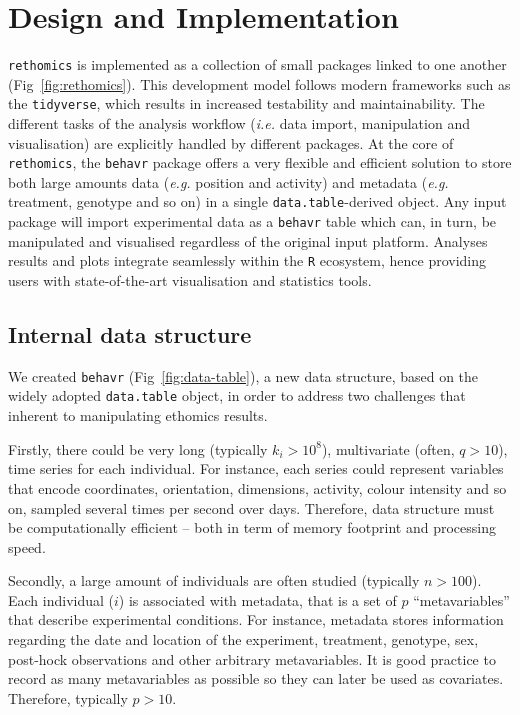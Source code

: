 \documentclass[10pt,letterpaper]{article}
\begin{document}
\section*{Design and Implementation}

\texttt{rethomics} is implemented as a collection of small packages linked to one another (Fig~\ref{fig:rethomics}).
This development model follows modern frameworks such as the \texttt{tidyverse}, which results in increased testability and maintainability.
The different tasks of the analysis workflow (\emph{i.e.} data import, manipulation and visualisation)
are explicitly handled by different packages.
At the core of \texttt{rethomics}, the \texttt{behavr} package offers a very flexible and efficient solution to store both large amounts data (\emph{e.g.} position and activity) and metadata (\emph{e.g.} treatment, genotype and so on) in a single \texttt{data.table}-derived object.
Any input package will import experimental data as a \texttt{behavr} table which can, in turn, be manipulated and visualised regardless of the original input platform.
Analyses results and plots integrate seamlessly within the \texttt{R} ecosystem, hence providing users with state-of-the-art visualisation and statistics tools.


\subsection*{Internal data structure}
We created \texttt{behavr} (Fig~\ref{fig:data-table}), a new data structure, based on the widely adopted \texttt{data.table} object, in order to address 
two challenges that inherent to manipulating ethomics results.

Firstly, there could be very long (typically $k_i > 10^8$), multivariate (often, $q > 10$), time series for each individual.
For instance, each series could represent variables that encode coordinates, orientation, dimensions, activity, colour intensity and so on, sampled several times per second over days. Therefore, data structure must be computationally efficient -- both in term of memory footprint and processing speed. 

Secondly, a large amount of individuals are often studied (typically $n > 100$).
Each individual ($i$) is associated with metadata, that is a set of $p$ ``metavariables'' that describe experimental conditions.
For instance, metadata stores information regarding the date and location of the experiment, treatment, genotype, sex, post-hock observations and other arbitrary metavariables.
It is good practice to record as many metavariables as possible so they can later be used as covariates. 
Therefore, typically $p > 10$.
 
\end{document}
